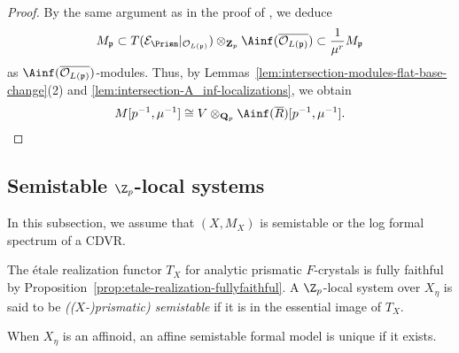 \begin{proof}
By the same argument as in the proof of \cite[Thm.~3.29(i)]{du-liu-moon-shimizu-completed-prismatic-F-crystal-loc-system}, we deduce
\[
M_{\mathfrak{p}} \subset T(\mathcal{E}_\Prism |_{\mathcal{O}_{L(\mathfrak{p})}})\otimes_{\mathbf{Z}_p} \Ainf(\overline{\mathcal{O}_{L(\mathfrak{p})}}) \subset \frac{1}{\mu^r} M_{\mathfrak{p}}
\]
as $\Ainf(\overline{\mathcal{O}_{L(\mathfrak{p})}})$-modules. Thus, by Lemmas~\ref{lem:intersection-modules-flat-base-change}(2) and \ref{lem:intersection-A_inf-localizations}, we obtain 
\[
M[p^{-1}, \mu^{-1}] \cong V\otimes_{\mathbf{Q}_p}\Ainf(\overline{R})[p^{-1}, \mu^{-1}].
\]
\end{proof}



\subsection{Semistable \texorpdfstring{$\Z_p$}{Zp}-local systems} \label{subsec:prismatic-semistable-local-system}

In this subsection, we assume that $(X,M_X)$ is semistable or the log formal spectrum of a CDVR.

\begin{defn} \label{defn:semistablity-via-analy-prismatic-F-crystal}
The \'etale realization functor $T_X$ for analytic prismatic $F$-crystals is fully faithful by Proposition~\ref{prop:etale-realization-fullyfaithful}. A $\Z_p$-local system over $X_\eta$ is said to be \emph{(($X$-)prismatic) semistable} if it is in the essential image of $T_X$.
\end{defn}

When $X_\eta$ is an affinoid, an affine semistable formal model is unique if it exists. 

